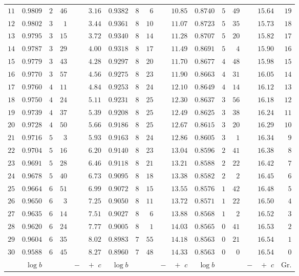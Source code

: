 \begin{center}
\begin{tabular}{r||r|rr|r||r|rr|r||r|rr|r||r}
$11$&$0.9809$&$2$&$46$&$3.16$&$0.9382$&$8$&$6$&$10.85$&$0.8740$&$5$&$49$&$15.64$&$19$\\
$12$&$0.9802$&$3$&$1$&$3.44$&$0.9361$&$8$&$10$&$11.07$&$0.8723$&$5$&$35$&$15.73$&$18$\\
$13$&$0.9795$&$3$&$15$&$3.72$&$0.9340$&$8$&$14$&$11.28$&$0.8707$&$5$&$20$&$15.82$&$17$\\
$14$&$0.9787$&$3$&$29$&$4.00$&$0.9318$&$8$&$17$&$11.49$&$0.8691$&$5$&$4$&$15.90$&$16$\\
$15$&$0.9779$&$3$&$43$&$4.28$&$0.9297$&$8$&$20$&$11.70$&$0.8677$&$4$&$48$&$15.98$&$15$\\[3pt]
$16$&$0.9770$&$3$&$57$&$4.56$&$0.9275$&$8$&$23$&$11.90$&$0.8663$&$4$&$31$&$16.05$&$14$\\
$17$&$0.9760$&$4$&$11$&$4.84$&$0.9253$&$8$&$24$&$12.10$&$0.8649$&$4$&$14$&$16.12$&$13$\\
$18$&$0.9750$&$4$&$24$&$5.11$&$0.9231$&$8$&$25$&$12.30$&$0.8637$&$3$&$56$&$16.18$&$12$\\
$19$&$0.9739$&$4$&$37$&$5.39$&$0.9208$&$8$&$25$&$12.49$&$0.8625$&$3$&$38$&$16.24$&$11$\\
$20$&$0.9728$&$4$&$50$&$5.66$&$0.9186$&$8$&$25$&$12.67$&$0.8615$&$3$&$20$&$16.29$&$10$\\[3pt]
$21$&$0.9716$&$5$&$3$&$5.93$&$0.9163$&$8$&$24$&$12.86$&$0.8605$&$3$&$1$&$16.34$&$9$\\
$22$&$0.9704$&$5$&$16$&$6.20$&$0.9140$&$8$&$23$&$13.04$&$0.8596$&$2$&$41$&$16.38$&$8$\\
$23$&$0.9691$&$5$&$28$&$6.46$&$0.9118$&$8$&$21$&$13.21$&$0.8588$&$2$&$22$&$16.42$&$7$\\
$24$&$0.9678$&$5$&$40$&$6.73$&$0.9095$&$8$&$18$&$13.38$&$0.8582$&$2$&$2$&$16.45$&$6$\\
$25$&$0.9664$&$6$&$51$&$6.99$&$0.9072$&$8$&$15$&$13.55$&$0.8576$&$1$&$42$&$16.48$&$5$\\[3pt]
$26$&$0.9650$&$6$&$3$&$7.25$&$0.9050$&$8$&$11$&$13.72$&$0.8571$&$1$&$22$&$16.50$&$4$\\
$27$&$0.9635$&$6$&$14$&$7.51$&$0.9027$&$8$&$6$&$13.88$&$0.8568$&$1$&$2$&$16.52$&$3$\\
$28$&$0.9620$&$6$&$24$&$7.77$&$0.9005$&$8$&$1$&$14.03$&$0.8565$&$0$&$41$&$16.53$&$2$\\
$29$&$0.9604$&$6$&$35$&$8.02$&$0.8983$&$7$&$55$&$14.18$&$0.8563$&$0$&$21$&$16.54$&$1$\\
$30$&$0.9588$&$6$&$45$&$8.27$&$0.8960$&$7$&$48$&$14.33$&$0.8563$&$0$&$0$&$16.54$&$0$\\
\hline
&$\log b$&&&$\log b$&&&$\log b$&&&Gr.\\

\end{tabular}
\end{center}
